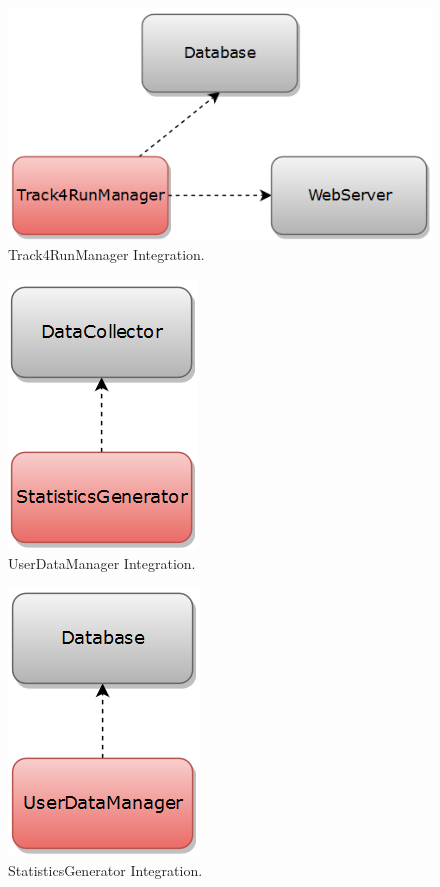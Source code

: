 \begin{figure}[H]
\centering
\includegraphics[scale=0.7]{Images/IntegrationPlanImages/fig4.png}
\caption{Track4RunManager Integration.}
\end{figure}

\begin{figure}[H]
\centering
\includegraphics[scale=0.7]{Images/IntegrationPlanImages/fig5.png}
\caption{UserDataManager Integration.}
\end{figure}

\begin{figure}[H]
\centering
\includegraphics[scale=0.7]{Images/IntegrationPlanImages/fig6.png}
\caption{StatisticsGenerator Integration.}
\end{figure}


